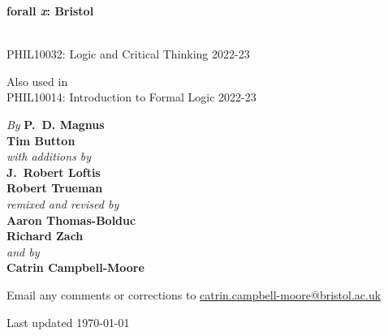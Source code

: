 


\pagestyle{empty}

\vspace*{80pt}



\begin{center}
\fontsize{30pt}{24pt}\sffamily
\selectfont
  \textbf{forall\!
  {\fontsize{37pt}{24pt}\selectfont\rmfamily\textit{x}}: 
  Bristol}
\end{center}

\bigskip \fontsize{12pt}{16pt}\selectfont
{}\\
PHIL10032: Logic and Critical Thinking 2022-23

\medskip \noindent Also used in\\
PHIL10014: Introduction to Formal Logic 2022-23


\vfill\noindent
\fontsize{12pt}{16pt}\selectfont \textit{By } \textbf{P.~D. Magnus}\\
\textbf{Tim Button}\\
\textit{with additions by}\\
\textbf{J.~Robert Loftis}\\
\textbf{Robert Trueman}\\
\textit{remixed and revised by}\\
\textbf{Aaron Thomas-Bolduc}\\ \textbf{Richard Zach}\\
\textit{and by}\\
\textbf{Catrin Campbell-Moore}

\vfill
\noindent Email any comments or corrections to \href{mailto:catrin.campbell-moore@bristol.ac.uk}{catrin.campbell-moore@bristol.ac.uk}

\noindent Last updated \today\par



\newpage


